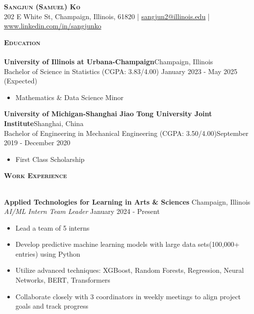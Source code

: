 \documentclass[a4paper]{article}
\newcommand{\lineunder} {
    \vspace*{-8pt} \\
    \hspace*{-18pt} \hrulefill \\
}
\newcommand{\header} [1] {
    {\hspace*{-18pt}\vspace*{6pt} \textsc{#1}}
    \vspace*{-6pt} \lineunder
}
\begin{document}
\vspace*{-40pt}

    

\vspace*{-10pt}
\begin{center}
	{\Huge \scshape \textbf{Sangjun (Samuel) Ko}}\\
    202 E White St, Champaign, Illinois, 61820 
    | \href{mailto:sangjun2@illinois.edu}{sangjun2@illinois.edu}
    | \href{https://www.linkedin.com/in/sangjunko}{www.linkedin.com/in/sangjunko}

	  
\end{center}

\header{\textbf{Education}}
\textbf{University of Illinois at Urbana-Champaign}\hfill Champaign, Illinois \\
Bachelor of Science in Statistics (CGPA: 3.83/4.00) \hfill January 2023 - May 2025 (Expected) \\ 
    \begin{itemize}[noitemsep]
        \item Mathematics \& Data Science Minor
    \end{itemize}

\textbf{University of Michigan-Shanghai Jiao Tong University Joint Institute}\hfill Shanghai, China\\
Bachelor of Engineering in Mechanical Engineering (CGPA: 3.50/4.00)\hfill September 2019 - December 2020\\
    \begin{itemize}[noitemsep]
        \item First Class Scholarship
    \end{itemize}

\vspace{2mm}

\header{\textbf{Work Experience}}
\vspace{1mm}


\textbf{Applied Technologies for Learning in Arts \& Sciences}
\hfill Champaign, Illinois\\
\textit{AI/ML Intern Team Leader} \hfill January 2024 - Present\\

    \begin{itemize}[noitemsep]
        \item Lead a team of 5 interns
        \item Develop predictive machine learning models with large data sets(100,000+ entries) using Python
        \item Utilize advanced techniques: XGBoost, Random Forests, Regression, Neural Networks, BERT, Transformers
        \item Collaborate closely with 3 coordinators in weekly meetings to align project goals and track progress
    \end{itemize}
\end{document}
